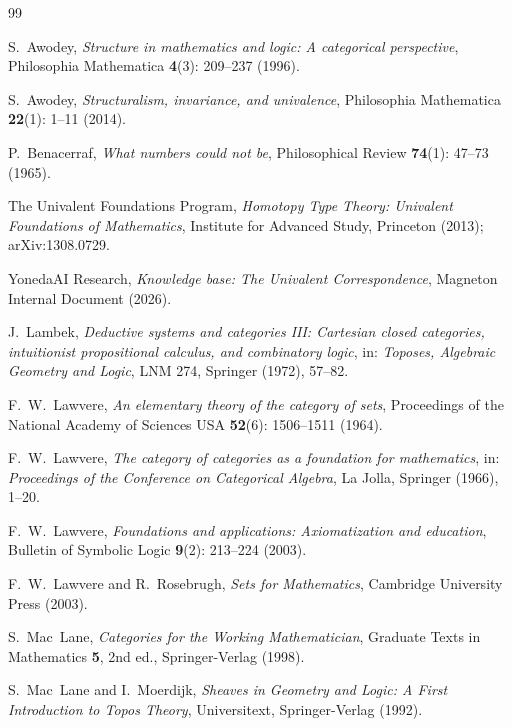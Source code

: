 \documentclass[12pt]{article}
\theoremstyle{definition}
\theoremstyle{remark}
\begin{document}
\begin{thebibliography}{99}

S.~Awodey,
\textit{Structure in mathematics and logic: A categorical perspective},
Philosophia Mathematica \textbf{4}(3): 209--237 (1996).

S.~Awodey,
\textit{Structuralism, invariance, and univalence},
Philosophia Mathematica \textbf{22}(1): 1--11 (2014).

P.~Benacerraf,
\textit{What numbers could not be},
Philosophical Review \textbf{74}(1): 47--73 (1965).

The Univalent Foundations Program,
\textit{Homotopy Type Theory: Univalent Foundations of Mathematics},
Institute for Advanced Study, Princeton (2013); arXiv:1308.0729.

YonedaAI Research,
\textit{Knowledge base: The Univalent Correspondence},
Magneton Internal Document (2026).

J.~Lambek,
\textit{Deductive systems and categories III: Cartesian closed categories, intuitionist propositional calculus, and combinatory logic},
in: \emph{Toposes, Algebraic Geometry and Logic}, LNM 274, Springer (1972), 57--82.

F.~W.~Lawvere,
\textit{An elementary theory of the category of sets},
Proceedings of the National Academy of Sciences USA \textbf{52}(6): 1506--1511 (1964).

F.~W.~Lawvere,
\textit{The category of categories as a foundation for mathematics},
in: \emph{Proceedings of the Conference on Categorical Algebra}, La Jolla, Springer (1966), 1--20.

F.~W.~Lawvere,
\textit{Foundations and applications: Axiomatization and education},
Bulletin of Symbolic Logic \textbf{9}(2): 213--224 (2003).

F.~W.~Lawvere and R.~Rosebrugh,
\textit{Sets for Mathematics},
Cambridge University Press (2003).

S.~Mac~Lane,
\textit{Categories for the Working Mathematician},
Graduate Texts in Mathematics \textbf{5}, 2nd ed., Springer-Verlag (1998).

S.~Mac~Lane and I.~Moerdijk,
\textit{Sheaves in Geometry and Logic: A First Introduction to Topos Theory},
Universitext, Springer-Verlag (1992).


\end{thebibliography}
\end{document}
